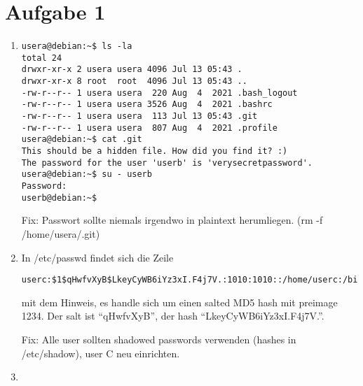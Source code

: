 \documentclass{article}
\begin{document}
\section*{Aufgabe 1}

\begin{enumerate}
    \item \begin{verbatim}
usera@debian:~$ ls -la
total 24
drwxr-xr-x 2 usera usera 4096 Jul 13 05:43 .
drwxr-xr-x 8 root  root  4096 Jul 13 05:43 ..
-rw-r--r-- 1 usera usera  220 Aug  4  2021 .bash_logout
-rw-r--r-- 1 usera usera 3526 Aug  4  2021 .bashrc
-rw-r--r-- 1 usera usera  113 Jul 13 05:43 .git
-rw-r--r-- 1 usera usera  807 Aug  4  2021 .profile
usera@debian:~$ cat .git
This should be a hidden file. How did you find it? :)
The password for the user 'userb' is 'verysecretpassword'.
usera@debian:~$ su - userb
Password: 
userb@debian:~$\end{verbatim}

    Fix: Passwort sollte niemals irgendwo in plaintext herumliegen. (rm -f /home/usera/.git)

    \item In /etc/passwd findet sich die Zeile
    \begin{verbatim}
userc:$1$qHwfvXyB$LkeyCyWB6iYz3xI.F4j7V.:1010:1010::/home/userc:/bin/bash\end{verbatim}
    mit dem Hinweis, es handle sich um einen salted MD5 hash mit preimage 1234. Der salt ist \enquote{qHwfvXyB}, der hash \enquote{LkeyCyWB6iYz3xI.F4j7V.}.

    Fix: Alle user sollten shadowed passwords verwenden (hashes in /etc/shadow), user C neu einrichten.

    \item 
\end{enumerate}
\end{document}
